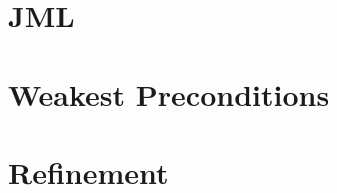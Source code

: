 \documentclass[landscape]{cheat}
\begin{document}
\begin{multicols*}{3}
\section{JML}

\section{Weakest Preconditions}

\section{Refinement}

\end{multicols*}
\end{document}
